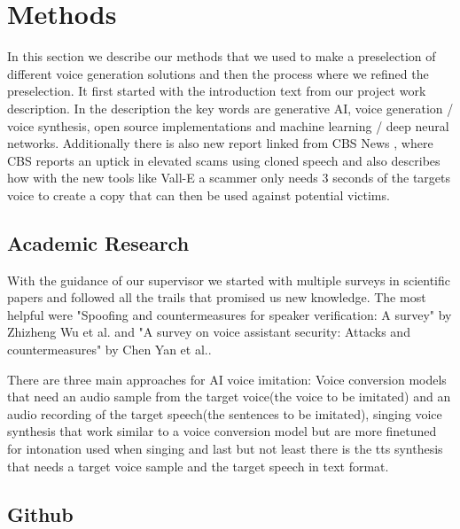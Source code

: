 \newpage
\section{Methods} \label{methods}

In this section we describe our methods that we used to make a preselection of different voice generation solutions and then the process where we refined the preselection.
It first started with the introduction text from our project work description. In the description the key words are generative AI, voice generation / voice synthesis, open source implementations and machine learning / deep neural networks. Additionally there is also new report linked from CBS News \cite{cbsnews2023voice}, where CBS reports an uptick in elevated scams using cloned speech and also describes how with the new tools like Vall-E a scammer only needs 3 seconds of the targets voice to create a copy that can then be used against potential victims.

\subsection{Academic Research}

With the guidance of our supervisor we started with multiple surveys in scientific papers and followed all the trails that promised us new knowledge. The most helpful were "Spoofing and countermeasures for speaker verification: A survey" by Zhizheng Wu et al.\cite{wu2015spoofing} and "A survey on voice assistant security: Attacks and countermeasures" by Chen Yan et al.\cite{yan2022survey}.

There are three main approaches for AI voice imitation: Voice conversion models that need an audio sample from the target voice(the voice to be imitated) and an audio recording of the target speech(the sentences to be imitated), singing voice synthesis that work similar to a voice conversion model but are more finetuned for intonation used when singing and last but not least there is the \gls{tts} synthesis that needs a target voice sample and the target speech in text format.


\subsection{Github}


